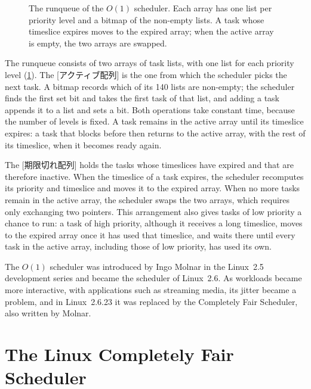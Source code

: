 \documentclass[../main.tex]{subfiles}
\begin{document}
\begin{figure}[htbp]
  \centering
  
  \caption{The runqueue of the $O(1)$ scheduler.  Each array has one list
    per priority level and a bitmap of the non-empty lists.  A task whose
    timeslice expires moves to the expired array; when the active array is
    empty, the two arrays are swapped.}
  \label{fig:l07-o1}
\end{figure}

The runqueue consists of two arrays of task lists, with one list for each
priority level (\cref{fig:l07-o1}).  The [アクティブ配列]
is the one from which the scheduler picks the next task.  A bitmap records
which of its 140 lists are non-empty; the scheduler finds the first set bit
and takes the first task of that list, and adding a task appends it to a
list and sets a bit.  Both operations take constant time, because the
number of levels is fixed.  A task remains in the active array until its
timeslice expires: a task that blocks before then returns to the active
array, with the rest of its timeslice, when it becomes ready again.

The [期限切れ配列] holds the tasks whose timeslices
have expired and that are therefore inactive.  When the timeslice of a task
expires, the scheduler recomputes its priority and timeslice and moves it to
the expired array.  When no more tasks remain in the active array, the
scheduler swaps the two arrays, which requires only exchanging two
pointers.  This arrangement also gives tasks of low priority a chance to
run: a task of high priority, although it receives a long timeslice, moves
to the expired array once it has used that timeslice, and waits there
until every task in the active array, including those of low priority, has
used its own.

The $O(1)$ scheduler was introduced by Ingo Molnar in the Linux~2.5
development series and became the scheduler of Linux~2.6.  As workloads
became more interactive, with applications such as streaming media, its
jitter became a problem, and in Linux~2.6.23 it was replaced by the
Completely Fair Scheduler, also written by Molnar.

\section{The Linux Completely Fair Scheduler}
\label{sec:l07-cfs}
\end{document}
